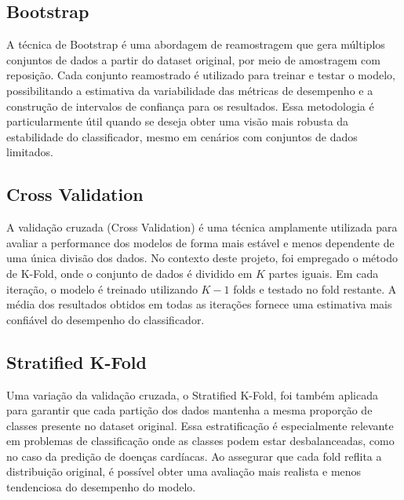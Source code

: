 \documentclass[conference]{IEEEtran}
\begin{document}
\subsection{Bootstrap}
A técnica de Bootstrap é uma abordagem de reamostragem que gera múltiplos conjuntos de dados a partir do dataset original, por meio de amostragem com reposição. Cada conjunto reamostrado é utilizado para treinar e testar o modelo, possibilitando a estimativa da variabilidade das métricas de desempenho e a construção de intervalos de confiança para os resultados. Essa metodologia é particularmente útil quando se deseja obter uma visão mais robusta da estabilidade do classificador, mesmo em cenários com conjuntos de dados limitados.

\subsection{Cross Validation}
A validação cruzada (Cross Validation) é uma técnica amplamente utilizada para avaliar a performance dos modelos de forma mais estável e menos dependente de uma única divisão dos dados. No contexto deste projeto, foi empregado o método de K-Fold, onde o conjunto de dados é dividido em $K$ partes iguais. Em cada iteração, o modelo é treinado utilizando $K-1$ folds e testado no fold restante. A média dos resultados obtidos em todas as iterações fornece uma estimativa mais confiável do desempenho do classificador.

\subsection{Stratified K-Fold}
Uma variação da validação cruzada, o Stratified K-Fold, foi também aplicada para garantir que cada partição dos dados mantenha a mesma proporção de classes presente no dataset original. Essa estratificação é especialmente relevante em problemas de classificação onde as classes podem estar desbalanceadas, como no caso da predição de doenças cardíacas. Ao assegurar que cada fold reflita a distribuição original, é possível obter uma avaliação mais realista e menos tendenciosa do desempenho do modelo.
\end{document}
